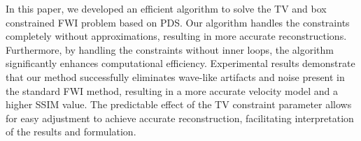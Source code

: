 In this paper, we developed an efficient algorithm to solve the TV and box constrained FWI problem based on PDS.
Our algorithm handles the constraints completely without approximations, resulting in more accurate reconstructions.
Furthermore, by handling the constraints without inner loops, the algorithm significantly enhances computational efficiency.
Experimental results demonstrate that our method successfully eliminates wave-like artifacts and noise present in the standard FWI method, resulting in a more accurate velocity model and a higher SSIM value.
The predictable effect of the TV constraint parameter allows for easy adjustment to achieve accurate reconstruction, facilitating interpretation of the results and formulation.

